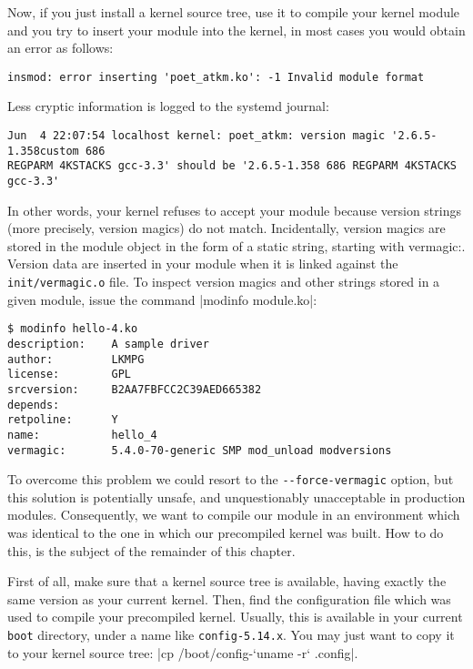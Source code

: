 \documentclass[10pt, oneside]{book}
\begin{document}
Now, if you just install a kernel source tree, use it to compile your kernel module and you try to insert your module into the kernel, in most cases you would obtain an error as follows:

\begin{verbatim}
insmod: error inserting 'poet_atkm.ko': -1 Invalid module format
\end{verbatim}

Less cryptic information is logged to the systemd journal:

\begin{verbatim}
Jun  4 22:07:54 localhost kernel: poet_atkm: version magic '2.6.5-1.358custom 686
REGPARM 4KSTACKS gcc-3.3' should be '2.6.5-1.358 686 REGPARM 4KSTACKS gcc-3.3'
\end{verbatim}

In other words, your kernel refuses to accept your module because version strings (more precisely, version magics) do not match.
Incidentally, version magics are stored in the module object in the form of a static string, starting with vermagic:.
Version data are inserted in your module when it is linked against the \verb|init/vermagic.o| file.
To inspect version magics and other strings stored in a given module, issue the command \sh|modinfo module.ko|:

\begin{verbatim}
$ modinfo hello-4.ko
description:    A sample driver
author:         LKMPG
license:        GPL
srcversion:     B2AA7FBFCC2C39AED665382
depends:
retpoline:      Y
name:           hello_4
vermagic:       5.4.0-70-generic SMP mod_unload modversions
\end{verbatim}

To overcome this problem we could resort to the \verb|--force-vermagic| option, but this solution is potentially unsafe, and unquestionably unacceptable in production modules.
Consequently, we want to compile our module in an environment which was identical to the one in which our precompiled kernel was built.
How to do this, is the subject of the remainder of this chapter.

First of all, make sure that a kernel source tree is available, having exactly the same version as your current kernel.
Then, find the configuration file which was used to compile your precompiled kernel.
Usually, this is available in your current \verb|boot| directory, under a name like \verb|config-5.14.x|.
You may just want to copy it to your kernel source tree: \sh|cp /boot/config-`uname -r` .config|.
\end{document}
